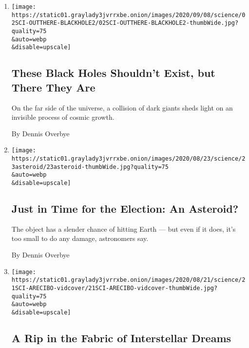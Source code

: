 \begin{enumerate}
\def\labelenumi{\arabic{enumi}.}
\item
  \href{/2020/09/02/science/black-hole-astronomy-physics.html}{}

  \texttt{[image: https://static01.graylady3jvrrxbe.onion/images/2020/09/08/science/02SCI-OUTTHERE-BLACKHOLE2/02SCI-OUTTHERE-BLACKHOLE2-thumbWide.jpg?quality=75\\\&auto=webp\\\&disable=upscale]}

  \hypertarget{these-black-holes-shouldnt-exist-but-there-they-are}{%
  \subsection{These Black Holes Shouldn't Exist, but There They
  Are}\label{these-black-holes-shouldnt-exist-but-there-they-are}}

  On the far side of the universe, a collision of dark giants sheds
  light on an invisible process of cosmic growth.

  By Dennis Overbye
\item
  \href{/2020/08/23/science/asteroid-election-meteor.html}{}

  \texttt{[image: https://static01.graylady3jvrrxbe.onion/images/2020/08/23/science/23asteroid/23asteroid-thumbWide.jpg?quality=75\\\&auto=webp\\\&disable=upscale]}

  \hypertarget{just-in-time-for-the-election-an-asteroid}{%
  \subsection{Just in Time for the Election: An
  Asteroid?}\label{just-in-time-for-the-election-an-asteroid}}

  The object has a slender chance of hitting Earth --- but even if it
  does, it's too small to do any damage, astronomers say.

  By Dennis Overbye
\item
  \href{/2020/08/21/science/space-telescope-puerto-rico-arecibo.html}{}

  \texttt{[image: https://static01.graylady3jvrrxbe.onion/images/2020/08/21/science/21SCI-ARECIBO-vidcover/21SCI-ARECIBO-vidcover-thumbWide.jpg?quality=75\\\&auto=webp\\\&disable=upscale]}

  \hypertarget{a-rip-in-the-fabric-of-interstellar-dreams}{%
  \subsection{A Rip in the Fabric of Interstellar
  Dreams}\label{a-rip-in-the-fabric-of-interstellar-dreams}}


\end{enumerate}
